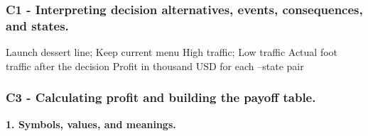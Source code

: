 	\subsubsection*{C1 - Interpreting decision alternatives, events, consequences, and states.}
	\label{subsec:problem3-local-cafe-investment-c1}

	\DecisionElementsTable
	{Launch dessert line; Keep current menu}
	{High traffic; Low traffic}
	{Actual foot traffic after the decision}
	{Profit in thousand USD for each --state pair}


	\subsubsection*{C3 - Calculating profit and building the payoff table.}
	\label{subsec:problem3-local-cafe-investment-c3}

\textbf{1. Symbols, values, and meanings.}

